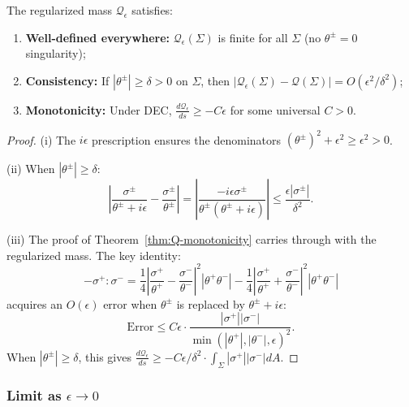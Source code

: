 \begin{lemma}
\label{lem:regularized-properties}
The regularized mass $\mathcal{Q}_\epsilon$ satisfies:
\begin{enumerate}[label=(\roman*)]
\item \textbf{Well-defined everywhere:} $\mathcal{Q}_\epsilon(\Sigma)$ is finite for all $\Sigma$ (no $\theta^\pm = 0$ singularity);
\item \textbf{Consistency:} If $|\theta^\pm| \geq \delta > 0$ on $\Sigma$, then $|\mathcal{Q}_\epsilon(\Sigma) - \mathcal{Q}(\Sigma)| = O(\epsilon^2/\delta^2)$;
\item \textbf{Monotonicity:} Under DEC, $\frac{d\mathcal{Q}_\epsilon}{ds} \geq -C\epsilon$ for some universal $C > 0$.
\end{enumerate}
\end{lemma}

\begin{proof}
(i) The $i\epsilon$ prescription ensures the denominators $(\theta^\pm)^2 + \epsilon^2 \geq \epsilon^2 > 0$.

(ii) When $|\theta^\pm| \geq \delta$:
\begin{equation}
\left|\frac{\sigma^\pm}{\theta^\pm + i\epsilon} - \frac{\sigma^\pm}{\theta^\pm}\right| = \left|\frac{-i\epsilon \sigma^\pm}{\theta^\pm(\theta^\pm + i\epsilon)}\right| \leq \frac{\epsilon |\sigma^\pm|}{\delta^2}.
\end{equation}

(iii) The proof of Theorem~\ref{thm:Q-monotonicity} carries through with the regularized mass. The key identity:
\begin{equation}
-\sigma^+:\sigma^- = \frac{1}{4}\left|\frac{\sigma^+}{\theta^+} - \frac{\sigma^-}{\theta^-}\right|^2 |\theta^+\theta^-| - \frac{1}{4}\left|\frac{\sigma^+}{\theta^+} + \frac{\sigma^-}{\theta^-}\right|^2 |\theta^+\theta^-|
\end{equation}
acquires an $O(\epsilon)$ error when $\theta^\pm$ is replaced by $\theta^\pm + i\epsilon$:
\begin{equation}
\text{Error} \leq C\epsilon \cdot \frac{|\sigma^+||\sigma^-|}{\min(|\theta^+|, |\theta^-|, \epsilon)^2}.
\end{equation}
When $|\theta^\pm| \geq \delta$, this gives $\frac{d\mathcal{Q}_\epsilon}{ds} \geq -C\epsilon/\delta^2 \cdot \int_\Sigma |\sigma^+||\sigma^-| dA$.
\end{proof}

\subsubsection{Limit as $\epsilon \to 0$}

